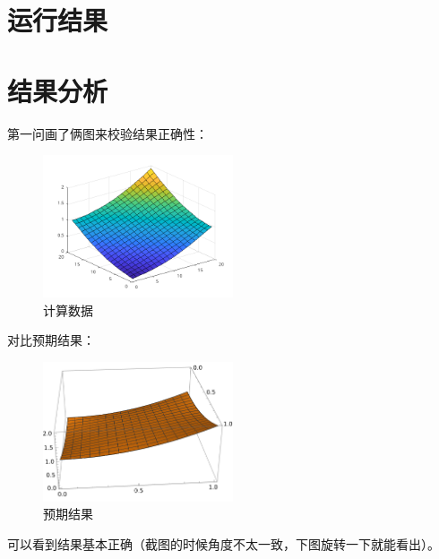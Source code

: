 \documentclass{article}
\begin{document}
\section{运行结果}



\newpage
\section{结果分析}

第一问画了俩图来校验结果正确性：
\begin{figure}[h]
    \centering
    \includegraphics[width=0.5\textwidth]{img/5/homework_5_1.png}
    \caption{计算数据}
\end{figure}

对比预期结果：

\begin{figure}[h]
    \centering
    \includegraphics[width=0.5\textwidth]{img/5/homework_5_1_expected.png}
    \caption{预期结果}
\end{figure}

可以看到结果基本正确（截图的时候角度不太一致，下图旋转一下就能看出）。
\end{document}
